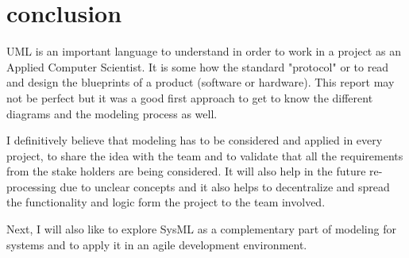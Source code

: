 \documentclass{article}
\begin{document}
            \section{conclusion}
            
            UML is an important language to understand in order to work in a project as an Applied Computer Scientist. It is some how the standard "protocol" or to read and design the blueprints of
            a product (software or hardware). This report may not be perfect but it was a good first approach to get to know the different diagrams and the modeling process as well. 
            
            I definitively believe that modeling has to be considered and applied in every project, to share the idea with the team and to validate that all the requirements from the stake holders are being
            considered. It will also help in the future re-processing due to unclear concepts and it also helps to decentralize and spread the functionality and logic form the project to the team involved.
            
            Next, I will also like to explore SysML as a complementary part of modeling for systems and to apply it in an agile development environment. 
            
        
            \newpage
            
            
            \nocite{*}
    
\end{document}
